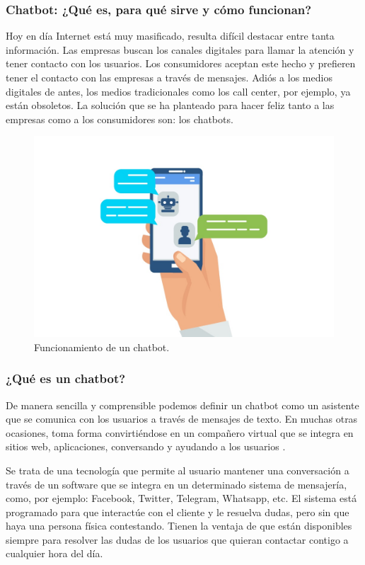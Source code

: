 \subsubsection{Chatbot: ¿Qué es, para qué sirve y cómo funcionan?}

Hoy en día Internet está muy masificado, resulta difícil destacar entre tanta información. Las empresas buscan los canales digitales para llamar la atención y tener contacto con los usuarios. Los consumidores aceptan este hecho y prefieren tener el contacto con las empresas a través de mensajes.
Adiós a los medios digitales de antes, los medios tradicionales como los call center, por ejemplo, ya están obsoletos. La solución que se ha planteado para hacer feliz tanto a las empresas como a los consumidores son: los chatbots.

\begin{figure}[htbp]
\centerline{\includegraphics[width = 0.5 \textwidth]{fig41.jpg}}
\caption{Funcionamiento de un chatbot.}
\label{fig41}
\end{figure}

\subsubsection{¿Qué es un chatbot?}

De manera sencilla y comprensible podemos definir un chatbot como un asistente que se comunica con los usuarios a través de mensajes de texto. En muchas otras ocasiones, toma forma convirtiéndose en un compañero virtual que se integra en sitios web, aplicaciones, conversando y ayudando a los usuarios \cite{Peris}.

Se trata de una tecnología que permite al usuario mantener una conversación a través de un software que se integra en un determinado sistema de mensajería, como, por ejemplo: Facebook, Twitter, Telegram, Whatsapp, etc.
El sistema está programado para que interactúe con el cliente y le resuelva dudas, pero sin que haya una persona física contestando. Tienen la ventaja de que están disponibles siempre para resolver las dudas de los usuarios que quieran contactar contigo a cualquier hora del día.

